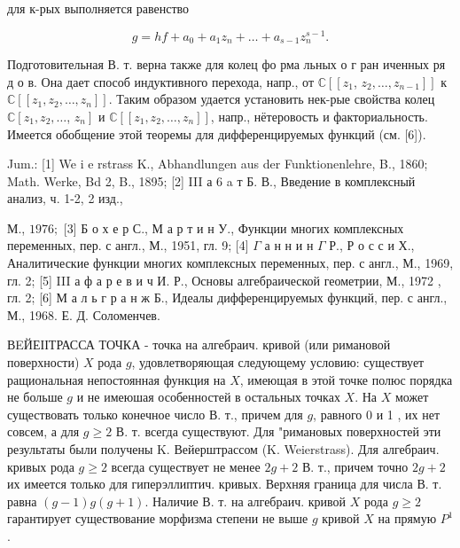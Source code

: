 \documentclass[10pt]{article}
\begin{document}
для к-рых выполняется равенство



\[

g=h f+a_{0}+a_{1} z_{n}+\ldots+a_{s-1} z_{n}^{s-1} .

\]



Подготовительная В. т. верна также для колец фо рма льных о г ран иченных ря д о в. Она дает способ индуктивного перехода, напр., от $\mathbb{C}\left[\left[z_{1}\right.\right.$, $\left.\left.z_{2}, \ldots, z_{n-1}\right]\right]$ к $\mathbb{C}\left[\left[z_{1}, z_{2}, \ldots, z_{n}\right]\right]$. Таким образом удается установить нек-рые свойства колец $\mathbb{C}\left[z_{1}, z_{2}, \ldots\right.$, $\left.z_{n}\right]$ и $\mathbb{C}\left[\left[z_{1}, z_{2}, \ldots, z_{n}\right]\right]$, напр., нётеровость и факториальность. Имеется обобщение этой теоремы для дифференцируемых функций (см. [6]).



Jum.: [1] We i e rstrass K., Abhandlungen aus der Funktionenlehre, B., 1860; Math. Werke, Bd 2, B., 1895; [2] III а 6 a т Б. В., Введение в комплексный анализ, ч. 1-2, 2 изд.,

М., $1976 ;$ [3] Б о х е р С., М а р т и н У., Функции многих комплексных переменных, пер. с англ., М., 1951, гл. 9; [4] $\Gamma$ а н н и н $\Gamma$ Р., Р о с с и Х., Аналитические функции многих комплексных переменных, пер. с англ., М., 1969, гл. 2; [5] III а ф а р е в и ч И. Р., Основы алгебраической геометрии, М., 1972 , гл. 2; [6] М а л ь г р а н ж Б., Идеалы дифференцируемых функций, пер. с англ., М., 1968. Е. Д. Соломенчев.



ВEЙЕІІТРАССА ТОЧКА - точка на алгебраич. кривой (или римановой поверхности) $X$ рода $g$, удовлетворяющая следующему условию: существует ращиональная непостоянная функция на $X$, имеющая в этой точке полюс порядка не больше $g$ и не имеюшая особенностей в остальных точках $X$. На $X$ может существовать только конечное число В. т., причем для $g$, равного 0 и 1 , их нет совсем, а для $g \geqslant 2$ В. т. всегда существуют. Для "римановых поверхностей эти результаты были получены $\mathrm{K}$. Вейерштрассом (K. Weierstrass). Для алгебраич. кривых рода $g \geqslant 2$ всегда существует не менее $2 g+2$ В. т., причем точно $2 g+2$ их имеется только для гиперэллиптич. кривых. Верхняя граница для числа В. т. равна $(g-1) g(g+1)$. Наличие В. т. на алгебраич. кривой $X$ рода $g \geqslant 2$ гарантирует существование морфизма степени не выше $g$ кривой $X$ на прямую $P^{1}$.
\end{document}
